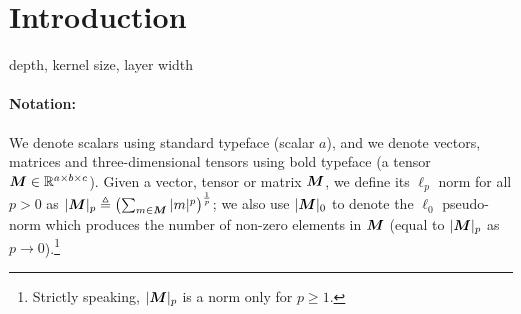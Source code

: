 \section{Introduction}

depth, kernel size, layer width

\paragraph{Notation:}
We denote scalars using standard typeface (\eg scalar $a$), and we denote vectors, matrices and three-dimensional tensors using bold typeface (\eg a tensor $\bm{M}  \in \mathbb R^{a \times b \times c}$). Given a vector, tensor or matrix $\bm{M}$, we define its $\ell_p$ norm for all $p>0$ as $|\bm{M}|_p \triangleq \left ( \sum_{m \in \bm{M}} |m|^p \right )^{\frac{1}{p}}$; we also use $|\bm{M}|_0$ to denote the $\ell_0$ pseudo-norm which produces the number of non-zero elements in $\bm{M}$ (equal to $|\bm{M}|_p$ as $p\rightarrow 0$).\footnote{Strictly speaking, $|\bm{M}|_p$ is a norm only for $p\geqslant 1$. } %





